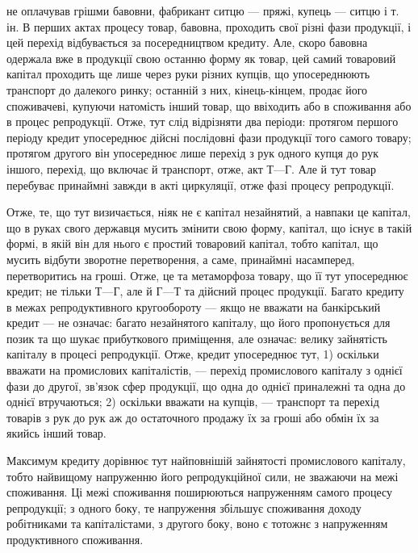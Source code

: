 \parcont{}  %
не оплачував грішми бавовни, фабрикант ситцю — пряжі, купець — ситцю і т. ін.
В перших актах процесу товар, бавовна, проходить свої різні фази продукції, і цей
перехід відбувається за посередництвом кредиту. Але, скоро бавовна одержала
вже в продукції свою останню форму як товар, цей самий товаровий капітал
проходить ще лише через руки різних купців, що упосереднюють транспорт до
далекого ринку; останній з них, кінець-кінцем, продає його споживачеві,
купуючи натомість інший товар, що ввіходить або в споживання або в процес
репродукції. Отже, тут слід відрізняти два періоди: протягом першого періоду
кредит упосереднює дійсні послідовні фази продукції того самого товару; протягом
другого він упосереднює лише перехід з рук одного купця до рук іншого, перехід,
що включає й транспорт, отже, акт $Т — Г$. Але й тут товар перебуває принаймні
завжди в акті циркуляції, отже фазі процесу репродукції.

Отже, те, що тут визичається, ніяк не є капітал незайнятий, а навпаки це
капітал, що в руках свого державця мусить змінити свою форму, капітал, що
існує в такій формі, в якій він для нього є простий товаровий капітал, тобто
капітал, що мусить відбути зворотне перетворення, а саме, принаймні насамперед,
перетворитись на гроші. Отже, це та метаморфоза товару, що її тут упосереднює
кредит; не тільки $Т — Г$, але й $Г — Т$ та дійсний процес продукції.
Багато кредиту в межах репродуктивного кругообороту — якщо не вважати на банкірський
кредит — не означає: багато незайнятого капіталу, що його пропонується
для позик та що шукає прибуткового приміщення, але означає: велику
зайнятість капіталу в процесі репродукції. Отже, кредит упосереднює тут,
1) оскільки вважати на промислових капіталістів, — перехід промислового капіталу
з однієї фази до другої, зв’язок сфер продукції, що одна до однієї приналежні
та одна до однієї втручаються; 2) оскільки вважати на купців, —
транспорт та перехід товарів з рук до рук аж до остаточного продажу їх за
гроші або обмін їх за якийсь інший товар.

Максимум кредиту дорівнює тут найповнішій зайнятості промислового капіталу,
тобто найвищому напруженню його репродукційної сили, не зважаючи на межі
споживання. Ці межі споживання поширюються напруженням самого процесу
репродукції; з одного боку, те напруження збільшує споживання доходу робітниками
та капіталістами, з другого боку, воно є тотожнє з напруженням продуктивного
споживання.

